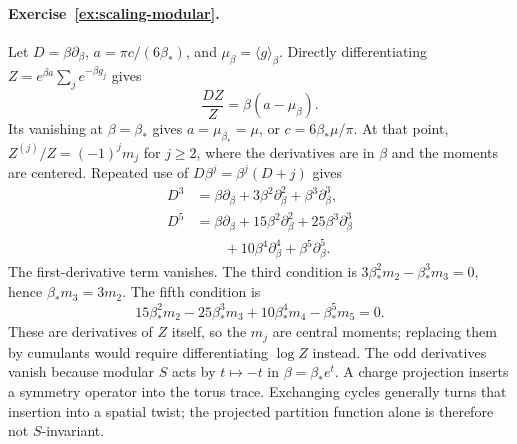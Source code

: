 \paragraph{Exercise~\ref{ex:scaling-modular}.}
\label{sol:ex:scaling-modular}
Let $D=\beta\partial_\beta$, $a=\pi c/(6\beta_*)$, and
$\mu_\beta=\langle g\rangle_\beta$. Directly differentiating
$Z=e^{\beta a}\sum_j e^{-\beta g_j}$ gives
\[
 \frac{D Z}{Z}=\beta(a-\mu_\beta).
\]
Its vanishing at $\beta=\beta_*$ gives $a=\mu_{\beta_*}=\mu$,
or $c=6\beta_*\mu/\pi$. At that point,
$Z^{(j)}/Z=(-1)^jm_j$ for $j\geq2$, where the derivatives
are in $\beta$ and the moments are centered. Repeated use of
$D\beta^j=\beta^j(D+j)$ gives
\begin{align*}
 D^3&=\beta\partial_\beta+3\beta^2\partial_\beta^2+
       \beta^3\partial_\beta^3,\\
 D^5&=\beta\partial_\beta+15\beta^2\partial_\beta^2+
       25\beta^3\partial_\beta^3\\
 &\hspace{2em}+10\beta^4\partial_\beta^4+
       \beta^5\partial_\beta^5.
\end{align*}
The first-derivative term vanishes. The third condition is
$3\beta_*^2m_2-\beta_*^3m_3=0$, hence $\beta_*m_3=3m_2$.
The fifth condition is
\[
 15\beta_*^2m_2-25\beta_*^3m_3
       +10\beta_*^4m_4-\beta_*^5m_5=0.
\]
These are derivatives of $Z$ itself, so the $m_j$ are central
moments; replacing them by cumulants would require differentiating
$\log Z$ instead. The odd
derivatives vanish because modular $S$ acts by $t\mapsto-t$
in $\beta=\beta_*e^t$. A charge projection inserts a symmetry
operator into the torus trace. Exchanging cycles generally
turns that insertion into a spatial twist; the projected
partition function alone is therefore not $S$-invariant.


